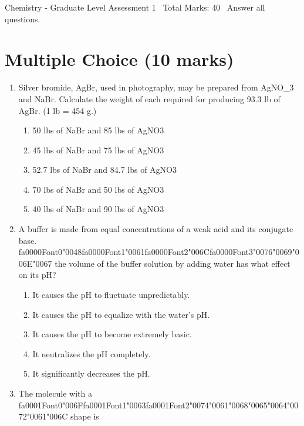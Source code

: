 \documentclass[12pt]{article}
\begin{document}
\begin{center}
Chemistry - Graduate Level Assessment 1 \
Total Marks: 40 \
Answer all questions.
\end{center}

\section*{Multiple Choice (10 marks)}
\begin{enumerate}[label=\arabic*.]
\item Silver bromide, AgBr, used in photography, may be prepared from AgNO\_3 and NaBr. Calculate
the weight of each required for producing 93.3 lb of AgBr. (1 lb = 454 g.)
\begin{enumerate}[label=(\alph*)]
    \item 50 lbs of NaBr and 85 lbs of AgNO3
    \item 45 lbs of NaBr and 75 lbs of AgNO3
    \item 52.7 lbs of NaBr and 84.7 lbs of AgNO3
    \item 70 lbs of NaBr and 50 lbs of AgNO3
    \item 40 lbs of NaBr and 90 lbs of AgNO3
\end{enumerate}
\item A buffer is made from equal concentrations of a weak acid and its conjugate base. {\csname fa0000Font0\endcsname\char"0048}{\csname fa0000Font1\endcsname\char"0061}{\csname fa0000Font2\endcsname\char"006C}{\csname fa0000Font3\endcsname\char"0076}{\char"0069}{\char"006E}{\char"0067}
the volume of the buffer solution by adding water has what effect on its pH?
\begin{enumerate}[label=(\alph*)]
    \item It causes the pH to fluctuate unpredictably.
    \item It causes the pH to equalize with the water's pH.
    \item It causes the pH to become extremely basic.
    \item It neutralizes the pH completely.
    \item It significantly decreases the pH.
\end{enumerate}
\item The molecule with a {\csname fa0001Font0\endcsname\char"006F}{\csname fa0001Font1\endcsname\char"0063}{\csname fa0001Font2\endcsname\char"0074}{\char"0061}{\char"0068}{\char"0065}{\char"0064}{\char"0072}{\char"0061}{\char"006C} shape is
\begin{enumerate}[label=(\alph*)]

\end{enumerate}
\end{enumerate}
\end{document}
